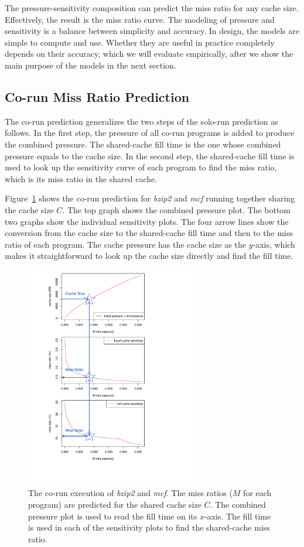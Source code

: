 The pressure-sensitivity composition can predict the miss ratio for
any cache size.  Effectively, the result is the miss ratio curve.  
The modeling of pressure and sensitivity is a balance between
simplicity and accuracy.  In design, the models are simple to compute
and use.  Whether they are useful in practice completely depends on
their accuracy, which we will evaluate empirically, after we show the
main purpose of the models in the next section.

\subsection{Co-run Miss Ratio Prediction}

The co-run prediction generalizes the two steps of the solo-run
prediction as follows.  In the first step, the pressure of all co-run
programs is added to produce the combined pressure.  The shared-cache
fill time is the one whose combined pressure equals to the cache size.
In the second step, the shared-cache fill time is used to look up the
sensitivity curve of each program to find the miss ratio, which is its
miss ratio in the shared cache.

Figure~\ref{fig:mix_compute_mr} shows the co-run prediction for
\emph{bzip2} and \emph{mcf} running together sharing the cache
size $C$.  The top graph shows the combined pressure plot.  The bottom
two graphs show the individual sensitivity plots.  The four arrow
lines show the conversion from the cache size to the shared-cache fill
time and then to the miss ratio of each program. The cache pressure
has the cache size as the $y$-axis, which makes it straightforward to
look up the cache size directly and find the fill time.  

\begin{figure}[h!]
\centering
\includegraphics[width=7.5cm,type=pdf,ext=.pdf,read=.pdf]{figures/corun/mix_compute_mr}
\caption{The co-run execution of \emph{bzip2} and \emph{mcf}.  The miss ratios ($M$ for each program) are predicted for the shared cache size $C$.  The combined pressure plot is used to read the fill time on its $x$-axis.  The fill time is used in each of the sensitivity plots to find the shared-cache miss ratio. }
\label{fig:mix_compute_mr}
\end{figure}

